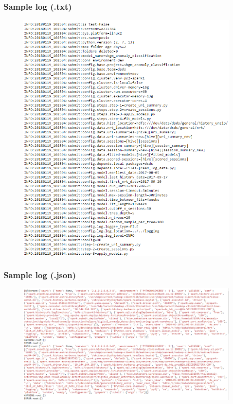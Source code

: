 \documentclass[11pt]{beamer}
\begin{document}
\begin{frame}
\frametitle{Sample log (.txt)}
\begin{figure}[h]
	\includegraphics[scale=.35]{images/txt_log}
\end{figure}
\end{frame}


\begin{frame}
\frametitle{Sample log (.json)}
\begin{figure}[h]
	\includegraphics[scale=.35]{images/json_log}
\end{figure}
\end{frame}
\end{document}
